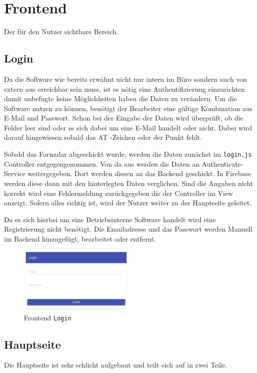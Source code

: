 \section{Frontend}
Der für den Nutzer sichtbare Bereich.
\subsection{Login}
Da die Software wie bereits erwähnt nicht nur intern im Büro sondern auch von extern aus erreichbar sein muss, ist es nötig eine Authentifizierung einzurichten damit unbefugte keine Möglichkeiten haben die Daten zu verändern. Um die Software nutzen zu können, benötigt der Bearbeiter eine gültige Kombination aus E-Mail und Passwort. Schon bei der Eingabe der Daten wird überprüft, ob die Felder leer sind oder es sich dabei um eine E-Mail handelt oder nicht. Dabei wird darauf hingewiesen sobald das AT -Zeichen oder der Punkt fehlt.

Sobald das Formular abgeschickt wurde, werden die Daten zunächst im \texttt{login.js} Controller entgegengenommen. Von da aus werden die Daten an Authenticate-Service weitergegeben. Dort werden diesen an das Backend geschickt. In Firebase werden diese dann mit den hinterlegten Daten verglichen. Sind die Angaben nicht korrekt wird eine Fehlermeldung zurückgegeben die der Controller im View anzeigt. Sofern alles richtig ist, wird der Nutzer weiter zu der Hauptseite geleitet.

Da es sich hierbei um eine Betriebsinterne Software handelt wird eine Registrierung nicht benötigt. Die Emailadresse und das Passwort werden Manuell im Backend hinzugefügt, bearbeitet oder entfernt.

\begin{figure}[H]
\centering\includegraphics[width=0.5\textwidth]{images/frontend_login.png}
\caption{Frontend \texttt{Login}}
\label{Login}
\end{figure}

\subsection{Hauptseite}
Die Hauptseite ist sehr schlicht aufgebaut und teilt sich auf in zwei Teile.

